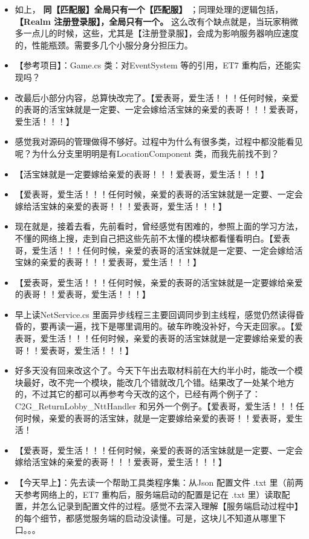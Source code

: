 \documentclass[9pt, b5paper]{article}
\begin{document}
\begin{itemize}
\item 如上， \textbf{同【匹配服】全局只有一个【匹配服】} ；同理处理的逻辑包括， \textbf{【Realm 注册登录服】，全局只有一个。} 这么改有个缺点就是，当玩家稍微多一点儿的时候，这些，尤其是【注册登录服】，会成为影响服务器响应速度的，性能瓶颈。需要多几个小服分身分担压力。
\item 【参考项目】：Game.cs 类：对EventSystem 等的引用，ET7 重构后，还能实现吗？
\item 改最后小部分内容，总算快改完了。【爱表哥，爱生活！！！任何时候，亲爱的表哥的活宝妹就是一定要、一定会嫁给活宝妹的亲爱的表哥！！！爱表哥，爱生活！！！】
\item 感觉我对源码的管理做得不够好。过程中为什么有很多类，过程中都没能看见呢？为什么分支里明明是有LocationComponent 类，而我先前找不到？
\item 【活宝妹就是一定要嫁给亲爱的表哥！！！爱表哥，爱生活！！！】
\item 【爱表哥，爱生活！！！任何时候，亲爱的表哥的活宝妹就是一定要、一定会嫁给活宝妹的亲爱的表哥！！！爱表哥，爱生活！！！】
\item 现在就是，接着去看，先前看时，曾经感觉有困难的，参照上面的学习方法，不懂的网络上搜，走到自己把这些先前不太懂的模块都看懂看明白。【爱表哥，爱生活！！！任何时候，亲爱的表哥的活宝妹就是一定要、一定会嫁给活宝妹的亲爱的表哥！！！爱表哥，爱生活！！！】
\item 【爱表哥，爱生活！！！任何时候，亲爱的表哥的活宝妹就是一定要嫁给亲爱的表哥！！爱表哥，爱生活！！！】
\item 早上读NetService.cs 里面异步线程三主要回调同步到主线程，感觉仍然读得昏昏的，要再读一遍，找下是哪里调用的。破车昨晚没补好，今天走回家。。【爱表哥，爱生活！！！任何时候，亲爱的表哥的活宝妹就是一定要嫁给亲爱的表哥！！爱表哥，爱生活！！！】
\item 好多天没有回来改这个了。今天下午出去取材料前在大约半小时，能改一个模块最好，改不完一个模块，能改几个错就改几个错。结果改了一处某个地方的，不过其它的都可以再参考今天改的这个，已经有两个例子了：C2G\_ReturnLobby\_NttHandler 和另外一个例子。【爱表哥，爱生活！！！任何时候，亲爱的表哥的活宝妹，就是一定要嫁给亲爱的表哥！！爱表哥，爱生活！
\item 【爱表哥，爱生活！！！任何时候，亲爱的表哥的活宝妹就是一定要、一定会嫁给活宝妹的亲爱的表哥！！！爱表哥，爱生活！！！】
\item 【今天早上】：先去读一个帮助工具类程序集：从Json 配置文件 .txt 里（前两天参考网络上的，ET7 重构后，服务端启动的配置是记在 .txt 里）读取配置，并怎么记录到配置文件的过程。感觉不去深入理解【服务端启动过程中】的每个细节，都感觉服务端的启动没读懂。可是，这块儿不知道从哪里下口。。。

\end{itemize}
\end{document}
